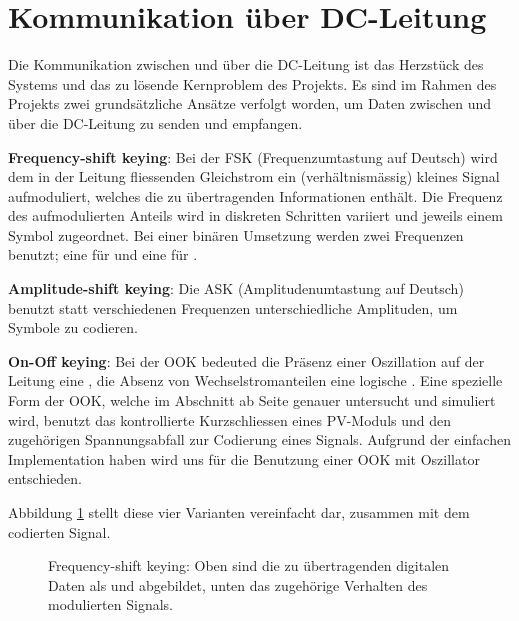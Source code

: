\section{Kommunikation \"uber DC-Leitung}
\label{sec:commDCLine}
\enlargethispage{2em}

Die Kommunikation zwischen  \Sensor und \Master \"uber die  DC-Leitung ist das
Herzst\"uck des Systems und das zu l\"osende Kernproblem des Projekts. Es sind
im Rahmen  des Projekts  zwei grunds\"atzliche  Ans\"atze verfolgt  worden, um
Daten  zwischen  \Sensor und  \Master~ \"uber  die  DC-Leitung zu  senden  und
empfangen.

\textbf{Frequency-shift keying}: Bei  der FSK (Frequenzumtastung  auf Deutsch)
wird  dem in  der Leitung  fliessenden Gleichstrom  ein (verh\"altnism\"assig)
kleines  Signal aufmoduliert,  welches  die  zu \"ubertragenden  Informationen
enth\"alt. Die Frequenz des aufmodulierten Anteils wird in diskreten Schritten
variiert und  jeweils einem  Symbol zugeordnet. Bei einer  bin\"aren Umsetzung
werden zwei Frequenzen benutzt; eine f\"ur  und eine f\"ur .

\textbf{Amplitude-shift  keying}: Die  ASK (Amplitudenumtastung  auf  Deutsch)
benutzt statt verschiedenen Frequenzen unterschiedliche Amplituden, um Symbole
zu codieren.

\textbf{On-Off keying}: Bei  der OOK bedeuted die  Pr\"asenz einer Oszillation
auf  der  Leitung eine  ,  die  Absenz von  Wechselstromanteilen  eine
logische  . Eine   spezielle  Form   der  OOK,  welche   im  Abschnitt
\emph{}  ab  Seite  \pageref{sec:simu:short}  genauer
untersucht  und  simuliert  wird,  benutzt  das  kontrollierte  Kurzschliessen
eines  PV-Moduls und  den  zugeh\"origen Spannungsabfall  zur Codierung  eines
Signals. Aufgrund  der  einfachen  Implementation  haben wird  uns  f\"ur  die
Benutzung einer OOK mit Oszillator entschieden.

Abbildung   \ref{fig:modulation:concepts}   stellt    diese   vier   Varianten
vereinfacht dar, zusammen mit dem codierten Signal.

\begin{figure}[h!tb]
    \centering
    
    \caption[Modulationsmethoden]{%
        Frequency-shift  keying: Oben sind  die  zu \"ubertragenden  digitalen
        Daten  als   und   abgebildet, unten  das zugeh\"orige
        Verhalten des modulierten Signals.%
    }
    \label{fig:modulation:concepts}
\end{figure}
